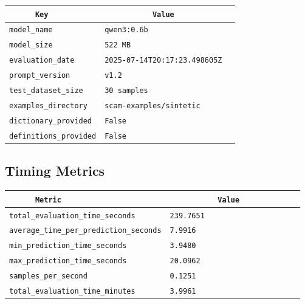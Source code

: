 \documentclass{article}
\begin{document}
\begin{center}
\begin{tabular}{l | l} \hline
    \verb|      Key      | & \verb|           Value           | \\ \hline
    \hline
    \verb|model_name    | & \verb|qwen3:0.6b                   | \\ \hline
    \verb|model_size    | & \verb|522 MB                       | \\ \hline
    \verb|evaluation_date| & \verb|2025-07-14T20:17:23.498605Z  | \\ \hline
    \verb|prompt_version| & \verb|v1.2                         | \\ \hline
    \verb|test_dataset_size| & \verb|30 samples                   | \\ \hline
    \verb|examples_directory| & \verb|scam-examples/sintetic       | \\ \hline
    \verb|dictionary_provided| & \verb|False                        | \\ \hline
    \verb|definitions_provided| & \verb|False                        | \\ \hline
\end{tabular}
\end{center}

\subsection{Timing Metrics}

\begin{center}
\begin{tabular}{l | l} \hline
    \verb|      Metric     | & \verb|           Value           | \\ \hline
    \hline
    \verb|total_evaluation_time_seconds| & \verb|239.7651                     | \\ \hline
    \verb|average_time_per_prediction_seconds| & \verb|7.9916                       | \\ \hline
    \verb|min_prediction_time_seconds| & \verb|3.9480                       | \\ \hline
    \verb|max_prediction_time_seconds| & \verb|20.0962                      | \\ \hline
    \verb|samples_per_second| & \verb|0.1251                       | \\ \hline
    \verb|total_evaluation_time_minutes| & \verb|3.9961                       | \\ \hline
\end{tabular}
\end{center}
\end{document}

